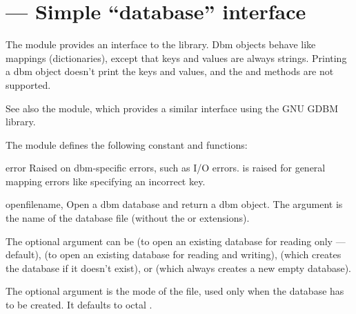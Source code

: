 \section{ ---
         Simple ``database'' interface}



The  module provides an interface to the \UNIX{}
 library.  Dbm objects behave like mappings
(dictionaries), except that keys and values are always strings.
Printing a dbm object doesn't print the keys and values, and the
 and  methods are not supported.

See also the  module, which
provides a similar interface using the GNU GDBM library.

The module defines the following constant and functions:

\begin{excdesc}{error}
Raised on dbm-specific errors, such as I/O errors.
 is raised for general mapping errors like
specifying an incorrect key.
\end{excdesc}

\begin{funcdesc}{open}{filename, }
Open a dbm database and return a dbm object.  The 
argument is the name of the database file (without the  or
 extensions).

The optional  argument can be
 (to open an existing database for reading only --- default),
 (to open an existing database for reading and writing),
 (which creates the database if it doesn't exist), or
 (which always creates a new empty database).

The optional  argument is the \UNIX{} mode of the file, used
only when the database has to be created.  It defaults to octal
.
\end{funcdesc}
